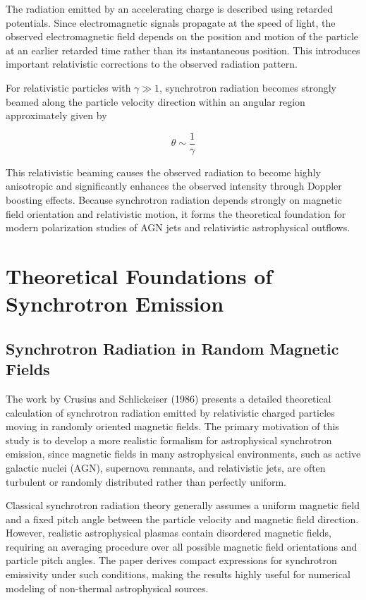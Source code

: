 \documentclass{article}
\begin{document}
The radiation emitted by an accelerating charge is described using retarded potentials. Since electromagnetic signals propagate at the speed of light, the observed electromagnetic field depends on the position and motion of the particle at an earlier retarded time rather than its instantaneous position. This introduces important relativistic corrections to the observed radiation pattern.

For relativistic particles with \(\gamma \gg 1\), synchrotron radiation becomes strongly beamed along the particle velocity direction within an angular region approximately given by

\begin{equation}
\theta \sim \frac{1}{\gamma}
\end{equation}

This relativistic beaming causes the observed radiation to become highly anisotropic and significantly enhances the observed intensity through Doppler boosting effects. Because synchrotron radiation depends strongly on magnetic field orientation and relativistic motion, it forms the theoretical foundation for modern polarization studies of AGN jets and relativistic astrophysical outflows.
\section{Theoretical Foundations of Synchrotron Emission}
\subsection{Synchrotron Radiation in Random Magnetic Fields}

The work by Crusius and Schlickeiser (1986) presents a detailed theoretical calculation of synchrotron radiation emitted by relativistic charged particles moving in randomly oriented magnetic fields. The primary motivation of this study is to develop a more realistic formalism for astrophysical synchrotron emission, since magnetic fields in many astrophysical environments, such as active galactic nuclei (AGN), supernova remnants, and relativistic jets, are often turbulent or randomly distributed rather than perfectly uniform.

Classical synchrotron radiation theory generally assumes a uniform magnetic field and a fixed pitch angle between the particle velocity and magnetic field direction. However, realistic astrophysical plasmas contain disordered magnetic fields, requiring an averaging procedure over all possible magnetic field orientations and particle pitch angles. The paper derives compact expressions for synchrotron emissivity under such conditions, making the results highly useful for numerical modeling of non-thermal astrophysical sources.
\end{document}
